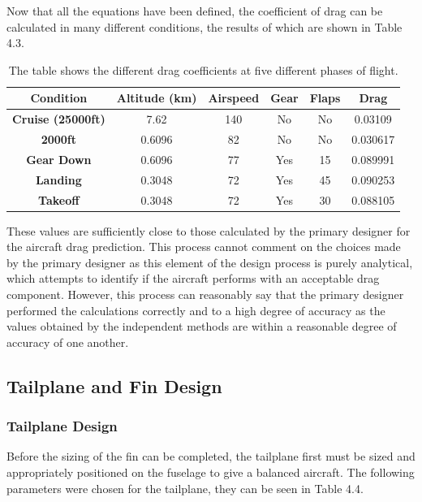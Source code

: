 \documentclass[stu, a4paper, 12pt, floatsintext]{apa7}
\numberwithin{figure}{section}
\numberwithin{table}{section}
\numberwithin{equation}{section}
\begin{document}
Now that all the equations have been defined, the coefficient of drag can be calculated in many different conditions, the results of which are shown in Table 4.3. 

\begin{table}[]
    \centering
    \caption{The table shows the different drag coefficients at five different phases of flight.}
    \label{tab:drag_values}
    \begin{tabular}{@{}cccccc@{}}
    \toprule 
    \textbf{Condition}        & \textbf{Altitude (km)} & \textbf{Airspeed} & \textbf{Gear} & \textbf{Flaps} & \textbf{Drag} \\ \midrule
    \textbf{Cruise (25000ft)} & 7.62                   & 140               & No            & No             & 0.03109       \\ 
    \textbf{2000ft}           & 0.6096                 & 82                & No            & No             & 0.030617      \\
    \textbf{Gear Down}        & 0.6096                 & 77                & Yes           & 15             & 0.089991      \\
    \textbf{Landing}          & 0.3048                 & 72                & Yes           & 45             & 0.090253      \\ 
    \textbf{Takeoff}          & 0.3048                 & 72                & Yes           & 30             & 0.088105      \\ \bottomrule
    \end{tabular}
\end{table}

These values are sufficiently close to those calculated by the primary designer for the aircraft drag prediction. This process cannot comment on the choices made by the primary designer as this element of the design process is purely analytical, which attempts to identify if the aircraft performs with an acceptable drag component. However, this process can reasonably say that the primary designer performed the calculations correctly and to a high degree of accuracy as the values obtained by the independent methods are within a reasonable degree of accuracy of one another.   
\subsection{Tailplane and Fin Design}
\subsubsection{Tailplane Design}
Before the sizing of the fin can be completed, the tailplane first must be sized and appropriately positioned on the fuselage to give a balanced aircraft. The following parameters were chosen for the tailplane, they can be seen in Table 4.4. 
\end{document}
